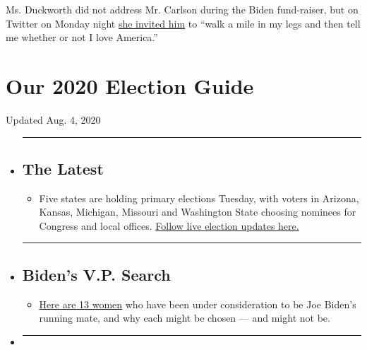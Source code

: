 Ms. Duckworth did not address Mr. Carlson during the Biden fund-raiser,
but on Twitter on Monday night
\href{https://twitter.com/SenDuckworth/status/1280313123887603712}{she
invited him} to ``walk a mile in my legs and then tell me whether or not
I love America.''

\hypertarget{our-2020-election-guide}{%
\section{Our 2020 Election Guide}\label{our-2020-election-guide}}

Updated Aug. 4, 2020

\begin{itemize}
\item
  \begin{center}\rule{0.5\linewidth}{\linethickness}\end{center}

  \hypertarget{the-latest}{%
  \subsection{The Latest}\label{the-latest}}

  \begin{itemize}
  \tightlist
  \item
    Five states are holding primary elections Tuesday, with voters in
    Arizona, Kansas, Michigan, Missouri and Washington State choosing
    nominees for Congress and local offices.
    \href{https://www.nytimes.com/2020/08/04/us/elections/primary-election-michigan-arizona-kansas.html?action=click\&pgtype=Article\&state=default\&region=BELOW_MAIN_CONTENT\&context=storylines_guide}{Follow
    live election updates here.}
  \end{itemize}
\item
  \begin{center}\rule{0.5\linewidth}{\linethickness}\end{center}

  \hypertarget{bidens-vp-search}{%
  \subsection{Biden's V.P. Search}\label{bidens-vp-search}}

  \begin{itemize}
  \tightlist
  \item
    \href{https://www.nytimes.com/article/biden-vice-president-2020.html?action=click\&pgtype=Article\&state=default\&region=BELOW_MAIN_CONTENT\&context=storylines_guide}{Here
    are 13 women} who have been under consideration to be Joe Biden's
    running mate, and why each might be chosen --- and might not be.
  \end{itemize}
\item
  \begin{center}\rule{0.5\linewidth}{\linethickness}\end{center}


\end{itemize}
